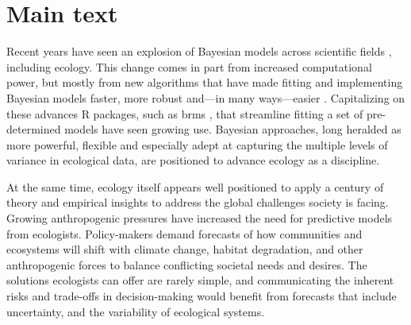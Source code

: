 \documentclass[11pt]{article}
\begin{document}
\setlength{\parindent}{0pt}
\setlength{\parskip}{7pt}

\section*{Main text}
Recent years have seen an explosion of Bayesian models across scientific fields \citep{vandeschoot2021,schad2021,grinsztajn2021}, including ecology. This change comes in part from increased computational power, but mostly from new algorithms \citep[e.g. Hamiltonian Monte Carlo,][]{nuts2014,betan2019} that have made fitting and implementing Bayesian models faster, more robust and---in many ways---easier \citep{Carpenter:2017stan}. Capitalizing on these advances \textsf{R} packages, such as \textsf{brms} \citep{burkner2017brms}, that streamline fitting a set of pre-determined models have seen growing use. Bayesian approaches, long heralded as more powerful, flexible and especially adept at capturing the multiple levels of variance in ecological data, are positioned to advance ecology as a discipline. %

 
At the same time, ecology itself appears well positioned to apply a century of theory and empirical insights to address the global challenges society is facing. Growing anthropogenic pressures have increased the need for predictive models from ecologists. Policy-makers demand forecasts of how communities and ecosystems will shift with climate change, habitat degradation, and other anthropogenic forces to balance conflicting societal needs and desires. The solutions ecologists can offer are rarely simple, and communicating the inherent risks and trade-offs in decision-making would benefit from forecasts that include uncertainty, and the variability of ecological systems. %
\end{document}
